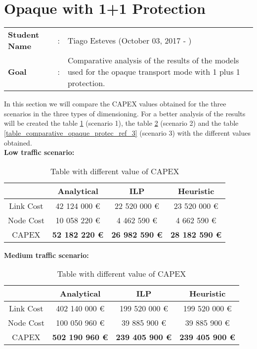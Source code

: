 \clearpage

\section{Opaque with 1+1 Protection}\label{comparative_Opaque_Protection}
\begin{tcolorbox}	
\begin{tabular}{p{2.75cm} p{0.2cm} p{10.5cm}} 	
\textbf{Student Name}  &:& Tiago Esteves    (October 03, 2017 - )\\
\textbf{Goal}          &:& Comparative analysis of the results of the models used for the opaque transport mode with 1 plus 1 protection.
\end{tabular}
\end{tcolorbox}
\vspace{11pt}


In this section we will compare the CAPEX values obtained for the three scenarios in the three types of dimensioning. For a better analysis of the results will be created the table \ref{table_comparative_opaque_protec_ref_1} (scenario 1), the table \ref{table_comparative_opaque_protec_ref_2} (scenario 2) and the table \ref{table_comparative_opaque_protec_ref_3} (scenario 3) with the different values obtained.\\

\textbf{Low traffic scenario:}

\begin{table}[h!]
\centering
\begin{tabular}{| c | c | c | c |}
 \hline
   & Analytical & ILP & Heuristic \\
 \hline\hline
 Link Cost & 42 124 000 \euro & 22 520 000 \euro & 23 520 000 \euro \\
 Node Cost & 10 058 220 \euro & 4 462 590 \euro & 4 662 590 \euro \\
 CAPEX & \textbf{52 182 220 \euro} & \textbf{26 982 590 \euro} & \textbf{28 182 590 \euro} \\
 \hline
\end{tabular}
\caption{Table with different value of CAPEX }
\label{table_comparative_opaque_protec_ref_1}
\end{table}


\vspace{11pt}
\textbf{Medium traffic scenario:}

\begin{table}[h!]
\centering
\begin{tabular}{| c | c | c | c |}
 \hline
   & Analytical & ILP & Heuristic \\
 \hline\hline
 Link Cost & 402 140 000 \euro & 199 520 000 \euro & 199 520 000 \euro \\
 Node Cost & 100 050 960 \euro & 39 885 900 \euro & 39 885 900 \euro \\
 CAPEX & \textbf{502 190 960 \euro} & \textbf{239 405 900 \euro} & \textbf{239 405 900 \euro} \\
 \hline
\end{tabular}
\caption{Table with different value of CAPEX }
\label{table_comparative_opaque_protec_ref_2}
\end{table}


